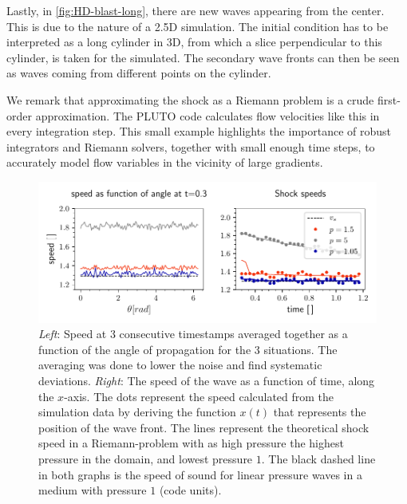 Lastly, in \cref{fig:HD-blast-long}, there are new waves appearing from the center. This is due to the nature of a 2.5D simulation.
The initial condition has to be interpreted as a long cylinder in 3D, from which a slice perpendicular to this cylinder, is taken for the simulated. 
The secondary wave fronts can then be seen as waves coming from different points on the cylinder.

We remark that approximating the shock as a Riemann problem is a crude first-order approximation. 
The PLUTO code calculates flow velocities like this in every integration step. 
This small example highlights the importance of robust integrators and Riemann solvers, together with small enough time steps, to accurately model flow variables in the vicinity of large gradients.

\begin{figure}[H]
	\centering
	\includegraphics[width=\linewidth]{images/HD-speed.pdf}
	\caption{\emph{Left}: Speed at 3 consecutive timestamps averaged together as a function of the angle of propagation for the 3 situations. 
		The averaging was done to lower the noise and find systematic deviations.
	\emph{Right}: The speed of the wave as a function of time, along the $x$-axis. 
	The dots represent the speed calculated from the simulation data by deriving the function $x(t)$ that represents the position of the wave front. 
	The lines represent the theoretical shock speed in a Riemann-problem with as high pressure the highest pressure in the domain, and lowest pressure $1$.
	The black dashed line in both graphs is the speed of sound for linear pressure waves in a medium with pressure $1$ (code units).}
	\label{fig:HD-speed}
\end{figure}

